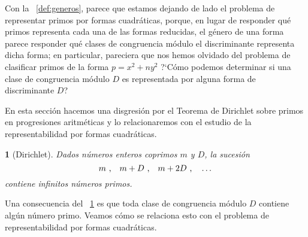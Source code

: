 \theoremstyle{plain}
\newtheorem{teoDirichlet}{\teoname}[section]
\newtheorem{coroDirichlet}[teoDirichlet]{\coroname}

\theoremstyle{definition}
\newtheorem{defDirichlet}[teoDirichlet]{}
\newtheorem{ejemDirichlet}[teoDirichlet]{\ejemname}
\newtheorem{obsDirichlet}[teoDirichlet]{\obsname}


Con la ~\ref{def:generos}, parece que estamos
dejando de lado el problema de representar primos por formas
cuadr\'aticas, porque, en lugar de responder qu\'e primos
representa cada una de las formas reducidas, el g\'enero de una
forma parece responder qu\'e clases de congruencia m\'odulo
el discriminante representa dicha forma;
en particular, pareciera que nos hemos olvidado del problema
de clasificar primos de la forma $p=x^2+ny^2$
?`C\'omo podemos determinar si una clase de congruencia m\'odulo $D$
es representada por alguna forma de discriminante $D$?

En esta secci\'on hacemos una disgresi\'on por el
Teorema de Dirichlet sobre primos en progresiones aritm\'eticas y
lo relacionaremos con el estudio de la representabilidad por formas
cuadr\'aticas.

\begin{teoDirichlet}[Dirichlet]\label{teo:dirichlet}
	Dados n\'umeros enteros coprimos $m$ y $D$, la sucesi\'on
	\begin{displaymath}
		m\text{ ,}\quad
		m+D\text{ ,}\quad
		m+2 D\text{ ,}\quad\dots
	\end{displaymath}
	contiene infinitos n\'umeros primos.
\end{teoDirichlet}

Una consecuencia del \teoname~\ref{teo:dirichlet} es que toda clase
de congruencia m\'odulo $D$ contiene alg\'un n\'umero primo.
Veamos c\'omo se relaciona esto con el problema de representabilidad
por formas cuadr\'aticas.

